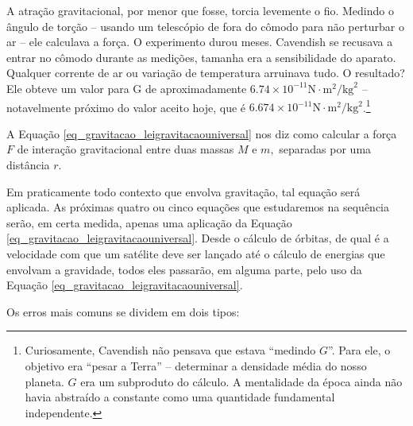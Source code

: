 \begin{enumerate}
A atração gravitacional, por menor que fosse, torcia levemente o fio. Medindo o ângulo de torção -- usando um telescópio de fora do cômodo para não perturbar o ar -- ele calculava a força. O experimento durou meses. Cavendish se recusava a entrar no cômodo durante as medições, tamanha era a sensibilidade do aparato. Qualquer corrente de ar ou variação de temperatura arruinava tudo.
O resultado? Ele obteve um valor para G de aproximadamente $6.74 × 10^{-11} \text{N} \cdot \text{m}^2/\text{kg}^2$ -- notavelmente próximo do valor aceito hoje, que é $6.674 × 10^{-11} \text{N} \cdot \text{m}^2/\text{kg}^2$.\footnote{Curiosamente, Cavendish não pensava que estava ``medindo $G$''. Para ele, o objetivo era ``pesar a Terra'' -- determinar a densidade média do nosso planeta. $G$ era um subproduto do cálculo. A mentalidade da época ainda não havia abstraído a constante como uma quantidade fundamental independente.}

\end{enumerate}










A Equação \eqref{eq_gravitacao_leigravitacaouniversal} nos diz como calcular a força $F$ de interação gravitacional entre duas massas $M$ e $m,$ separadas por uma distância $r$. 

Em praticamente todo contexto que envolva gravitação, tal equação será aplicada. As próximas quatro ou cinco equações que estudaremos na sequência serão, em certa medida, apenas uma aplicação da Equação \eqref{eq_gravitacao_leigravitacaouniversal}. Desde o cálculo de órbitas, de qual é a velocidade com que um satélite deve ser lançado até o cálculo de energias que envolvam a gravidade, todos eles passarão, em alguma parte, pelo uso da Equação \eqref{eq_gravitacao_leigravitacaouniversal}.





Os erros mais comuns se dividem em dois tipos:

